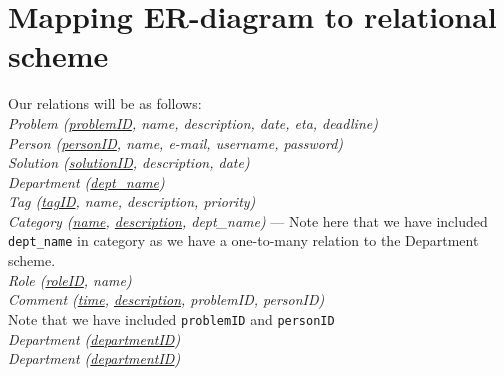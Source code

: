 \section{Mapping ER-diagram to relational scheme}
\label{sec:map_er_rel}

Our relations will be as follows:\\

\noindent \textit{Problem (\underline{problemID}, name, description, date, eta, deadline)} \\
\textit{Person (\underline{personID}, name, e-mail, username, password)} \\
\textit{Solution (\underline{solutionID}, description, date)} \\
\textit{Department (\underline{dept\_name})} \\
\textit{Tag (\underline{tagID}, name, description, priority)} \\
\textit{Category (\underline{name}, \underline{description}, dept\_name)} --- Note here that we have included \verb+dept_name+ in category as we have a one-to-many relation to the Department scheme.\\
\textit{Role (\underline{roleID}, name)} \\
\textit{Comment (\underline{time}, \underline{description}, problemID, personID)} \\
Note that we have included \verb+problemID+ and \verb+personID+ \\
\textit{Department (\underline{departmentID})} \\
\textit{Department (\underline{departmentID})} \\



